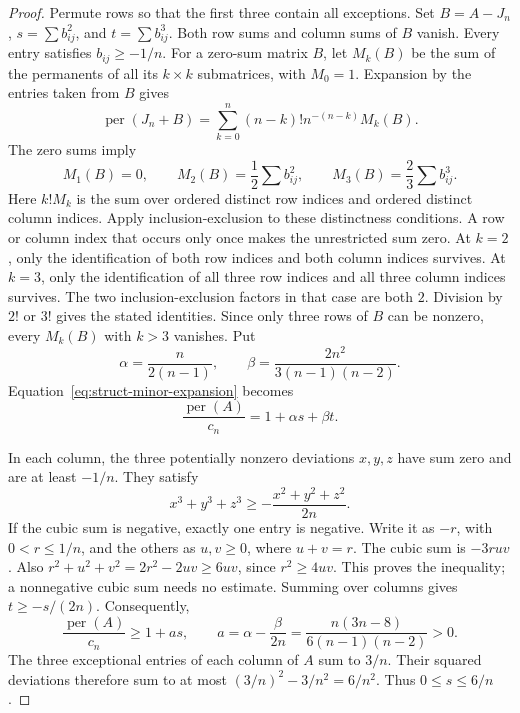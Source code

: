 \documentclass[11pt,a4paper]{article}
\theoremstyle{definition}
\theoremstyle{remark}
\newcommand{\per}{\operatorname{per}}
\begin{document}
\begin{proof}
Permute rows so that the first three contain all exceptions.
Set $B=A-J_n$, $s=\sum b_{ij}^2$, and $t=\sum b_{ij}^3$.
Both row sums and column sums of $B$ vanish.
Every entry satisfies $b_{ij}\ge-1/n$.
For a zero-sum matrix $B$, let $M_k(B)$ be the sum of the permanents of all its $k\times k$ submatrices, with $M_0=1$.
Expansion by the entries taken from $B$ gives
\begin{equation}\label{eq:struct-minor-expansion}
 \per(J_n+B)=\sum_{k=0}^n(n-k)!n^{-(n-k)}M_k(B).
\end{equation}
The zero sums imply
\[
 M_1(B)=0,\qquad M_2(B)=\frac12\sum b_{ij}^2,
 \qquad M_3(B)=\frac23\sum b_{ij}^3.
\]
Here $k!M_k$ is the sum over ordered distinct row indices and ordered distinct column indices.
Apply inclusion-exclusion to these distinctness conditions.
A row or column index that occurs only once makes the unrestricted sum zero.
At $k=2$, only the identification of both row indices and both column indices survives.
At $k=3$, only the identification of all three row indices and all three column indices survives.
The two inclusion-exclusion factors in that case are both $2$.
Division by $2!$ or $3!$ gives the stated identities.
Since only three rows of $B$ can be nonzero, every $M_k(B)$ with $k>3$ vanishes.
Put
\[
 \alpha=\frac{n}{2(n-1)},\qquad
 \beta=\frac{2n^2}{3(n-1)(n-2)}.
\]
Equation~\eqref{eq:struct-minor-expansion} becomes
\begin{equation}\label{eq:struct-cubic-permanent}
 \frac{\per(A)}{c_n}=1+\alpha s+\beta t.
\end{equation}

In each column, the three potentially nonzero deviations $x,y,z$ have sum zero and are at least $-1/n$.
They satisfy
\[
 x^3+y^3+z^3\ge-\frac{x^2+y^2+z^2}{2n}.
\]
If the cubic sum is negative, exactly one entry is negative.
Write it as $-r$, with $0<r\le1/n$, and the others as $u,v\ge0$, where $u+v=r$.
The cubic sum is $-3ruv$.
Also $r^2+u^2+v^2=2r^2-2uv\ge6uv$, since $r^2\ge4uv$.
This proves the inequality; a nonnegative cubic sum needs no estimate.
Summing over columns gives $t\ge-s/(2n)$.
Consequently,
\begin{equation}\label{eq:struct-lower}
 \frac{\per(A)}{c_n}\ge1+as,
 \qquad a=\alpha-\frac\beta{2n}
 =\frac{n(3n-8)}{6(n-1)(n-2)}>0.
\end{equation}
The three exceptional entries of each column of $A$ sum to $3/n$.
Their squared deviations therefore sum to at most
$(3/n)^2-3/n^2=6/n^2$.
Thus $0\le s\le6/n$.


\end{proof}
\end{document}

